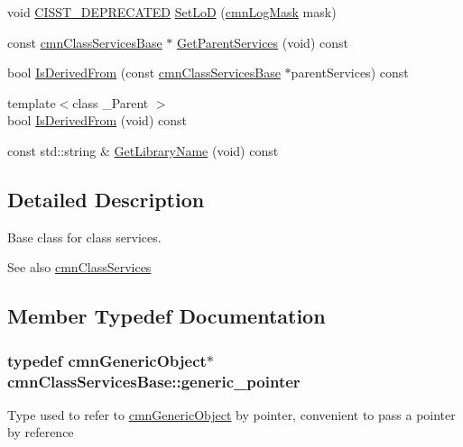 \begin{DoxyCompactItemize}
\item 
void \hyperlink{cmn_portability_8h_a63da7164735f9501be651b1f2bbc0121}{C\+I\+S\+S\+T\+\_\+\+D\+E\+P\+R\+E\+C\+A\+T\+E\+D} \hyperlink{classcmn_class_services_base_a0e5f1d9711b8a133d6a22b6043b5d8e3}{Set\+Lo\+D} (\hyperlink{cmn_log_lo_d_8h_a44b6ef7560b0d204460b0a54f1a5d702}{cmn\+Log\+Mask} mask)
\item 
const \hyperlink{classcmn_class_services_base}{cmn\+Class\+Services\+Base} $\ast$ \hyperlink{classcmn_class_services_base_a410b9a18f1f2f2dbebaf4171be08ea21}{Get\+Parent\+Services} (void) const 
\item 
bool \hyperlink{classcmn_class_services_base_aa83c6816e89ab34c491846a9412900ce}{Is\+Derived\+From} (const \hyperlink{classcmn_class_services_base}{cmn\+Class\+Services\+Base} $\ast$parent\+Services) const 
\item 
{\footnotesize template$<$class \+\_\+\+Parent $>$ }\\bool \hyperlink{classcmn_class_services_base_ae916d7288df4e83c4fc0e85a25ff2404}{Is\+Derived\+From} (void) const 
\item 
const std\+::string \& \hyperlink{classcmn_class_services_base_a7d253ca610d74b50b7196eba96208fd8}{Get\+Library\+Name} (void) const 
\end{DoxyCompactItemize}


\subsection{Detailed Description}
Base class for class services. 

\begin{DoxySeeAlso}{See also}
\hyperlink{classcmn_class_services}{cmn\+Class\+Services} 
\end{DoxySeeAlso}


\subsection{Member Typedef Documentation}
\hypertarget{classcmn_class_services_base_a859cb10b40a79b083c9ba0cae0d52afd}{}
\subsubsection[{generic\+\_\+pointer}]{\setlength{\rightskip}{0pt plus 5cm}typedef {\bf cmn\+Generic\+Object}$\ast$ {\bf cmn\+Class\+Services\+Base\+::generic\+\_\+pointer}}\label{classcmn_class_services_base_a859cb10b40a79b083c9ba0cae0d52afd}
Type used to refer to \hyperlink{classcmn_generic_object}{cmn\+Generic\+Object} by pointer, convenient to pass a pointer by reference 

